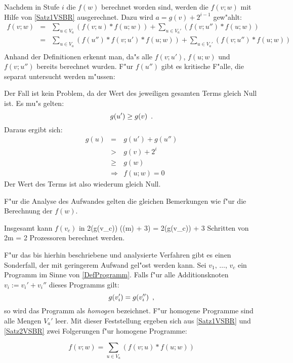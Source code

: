 Nachdem in Stufe $i$ die $f(w)$ berechnet worden sind, werden die $f(v;w)$
mit Hilfe von \ref{Satz1VSBR} ausgerechnet. Dazu wird $a= g(v) + 2^{i-1}$ 
gew"ahlt:
\begin{eqnarray*}
    f(v;w)
    & = &
        \sum_{u\in V_a} (f(v;u) * f(u;w)) +
        \sum_{u\in V_a'} (f(v;u'') * f(u;w)) \\
    & = &
        \sum_{u\in V_a} (f(u'') * f(v;u') * f(u;w)) +
        \sum_{u\in V_a'} (f(v;u'') * f(u;w)) \\
\end{eqnarray*}
Anhand der Definitionen erkennt man, da"s alle $f(v;u')$, $f(u;w)$ und
$f(v;u'')$ bereits berechnet wurden. F"ur $f(u'')$ gibt es kritische
F"alle, die separat untersucht werden m"ussen:
\begin{MyDescription}
    Der Fall ist kein Problem, da der Wert des jeweiligen gesamten Terms
    gleich Null ist.
    Es mu"s gelten:
    \[ g(u') \geq g(v) \mbox{\hspace{0.5em}.} \]
    Daraus ergibt sich:
    \begin{eqnarray*}
        g(u) & = & g(u') + g(u'') \\
             & > & g(v) + 2^i \\
             & \geq & g(w) \\
             & \Rightarrow & f(u;w) = 0
    \end{eqnarray*}
    Der Wert des Terms ist also wiederum gleich Null.
\end{MyDescription}

F"ur die Analyse des Aufwandes gelten die gleichen Bemerkungen wie f"ur
die Berechnung der $f(w)$.

Insgesamt kann $f(v_c)$ in
        2\lc \log(g(v_c)) \rc (\lc \log(m) \rc + 3) =
        2\lc \log(g(v_c)) \rc
        \lb \lc \log \lb {} 
                     \rb 
             \rc + 3
        \rb
\Eeq
Schritten von
   2m = 2  
\Eeq
Prozessoren berechnet werden.

F"ur das bis hierhin beschriebene und analysierte Verfahren gibt es einen
Sonderfall, der mit geringerem Aufwand gel"ost werden kann.
\MyBeginDef
\label{DefHomogen}
    Sei $v_1,\, \ldots ,\, v_c$ ein Programm im Sinne von \ref{DefProgramm}.
    Falls f"ur alle Additionsknoten $v_i:= v_i'+ v_i''$ dieses Programms 
    gilt:
    \[ g(v_i') = g(v_i'') \mbox{\hspace{0.5em},} \]
    so wird das Programm als {\em homogen} bezeichnet.
\MyEndDef
F"ur homogene Programme sind alle Mengen $V_a'$ leer. Mit dieser 
Feststellung ergeben sich aus \ref{Satz1VSBR} und \ref{Satz2VSBR} zwei
Folgerungen f"ur homogene Programme:
\begin{korollar}
\label{Satz3VSBR}
    \[
       f(v;w) =
           \sum_{u\in V_a} (f(v;u) * f(u;w))
    \]
\end{korollar}

